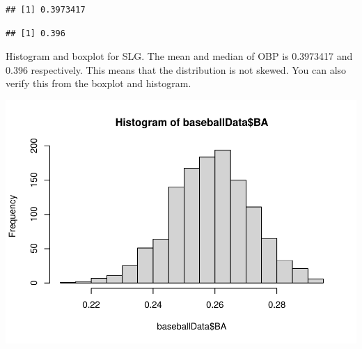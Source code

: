 \documentclass[
]{article}
\newenvironment{Shaded}{\begin{snugshade}}{\end{snugshade}}
\newcommand{\KeywordTok}[1]{\textcolor[rgb]{0.13,0.29,0.53}{\textbf{#1}}}
\newcommand{\NormalTok}[1]{#1}
\newcommand{\OperatorTok}[1]{\textcolor[rgb]{0.81,0.36,0.00}{\textbf{#1}}}
\begin{document}
\begin{verbatim}
## [1] 0.3973417
\end{verbatim}

\begin{Shaded}
\end{Shaded}

\begin{verbatim}
## [1] 0.396
\end{verbatim}

Histogram and boxplot for SLG. The mean and median of OBP is 0.3973417
and 0.396 respectively. This means that the distribution is not skewed.
You can also verify this from the boxplot and histogram.

\begin{Shaded}
\end{Shaded}

\includegraphics{HW2_Liu-Zi-Jian_files/figure-latex/unnamed-chunk-32-1.pdf}

\begin{Shaded}
\end{Shaded}
\end{document}
